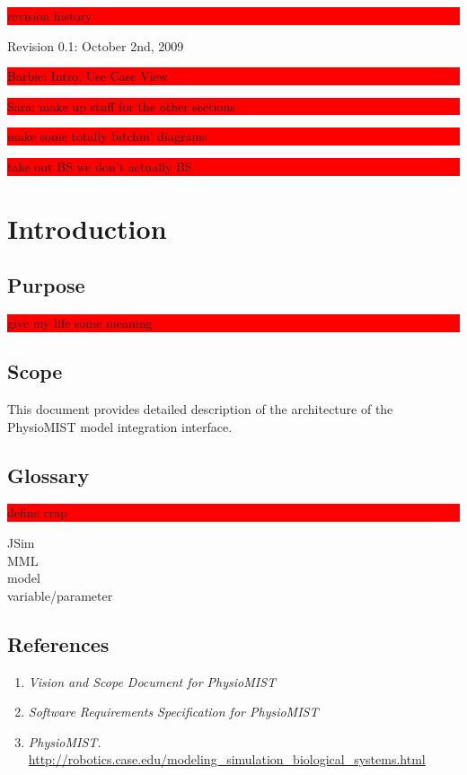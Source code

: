 \documentclass{article}
\title{\todo{PhysioMIST Design Crap}}
\author{Mark Caral, Sara Cummins, BarbaraJoy Jones, Joshua Lee}
\date{October 23, 2009\\{\sc Eecs} 393}
\newcommand{\todo}[1]{\colorbox{red}{\begin{minipage}{\textwidth}{#1}\end{minipage}}}
\begin{document}
\begin{titlepage}
\maketitle\thispagestyle{empty}
\end{titlepage}

\todo{revision history}
Revision 0.1: October 2nd, 2009
\newline
\todo{Barbie: Intro, Use Case View}
\todo{Sara: make up stuff for the other sections}
\newpage

\tableofcontents
\newpage

\todo{make some totally bitchin' diagrams}
\todo{take out BS we don't actually BS}

\section{Introduction}
\subsection{Purpose}
\todo{give my life some meaning}
\subsection{Scope}
This document provides detailed description of the architecture of the PhysioMIST model integration interface.
\subsection{Glossary}
\todo{define crap}
JSim\\
MML\\
model\\
variable/parameter
\subsection{References}
\begin{enumerate}
\item \emph{Vision and Scope Document for PhysioMIST}
\item \emph{Software Requirements Specification for PhysioMIST}
\item \emph{PhysioMIST.} \url{http://robotics.case.edu/modeling_simulation_biological_systems.html}
\end{enumerate}
\end{document}
